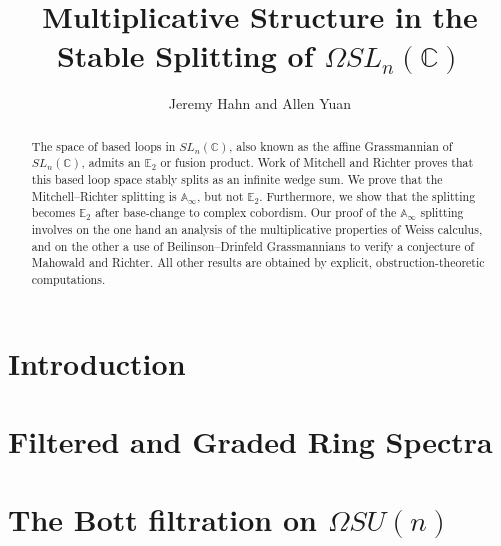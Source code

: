 \documentclass[reqno, oneside]{amsart}
\theoremstyle{definition}
\theoremstyle{plain}
\begin{document}
\title{Multiplicative Structure in the Stable Splitting of $\Omega SL_n(\mathbb{C})$}
\author{Jeremy Hahn and Allen Yuan}

\begin{abstract}
The space of based loops in $SL_n(\mathbb{C})$, also known as the affine Grassmannian of $SL_n(\mathbb{C})$, admits an $\mathbb{E}_2$ or fusion product.  Work of Mitchell and Richter proves that this based loop space stably splits as an infinite wedge sum.  We prove that the Mitchell--Richter splitting is $\mathbb{A}_\infty$, but not $\mathbb{E}_2$.  Furthermore, we show that the splitting becomes $\mathbb{E}_2$ after base-change to complex cobordism.  Our proof of the $\mathbb{A}_\infty$ splitting involves on the one hand an analysis of the multiplicative properties of Weiss calculus, and on the other a use of Beilinson--Drinfeld Grassmannians to verify a conjecture of Mahowald and Richter.  All other results are obtained by explicit, obstruction-theoretic computations.
\end{abstract}





\setcounter{tocdepth}{1}
\maketitle

\tableofcontents



\section{Introduction}



\section{Filtered and Graded Ring Spectra} \label{sec:FilGra}



\section{The Bott filtration on \texorpdfstring{$\Omega SU(n)$}{OmegaSU(n)}} \label{sec:MRFil}
\end{document}
